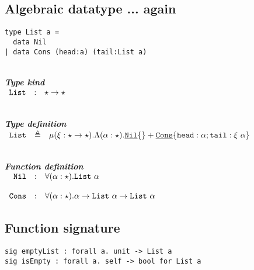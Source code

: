 \documentclass{article}[11pt]
\newcommand{\subsubsubsection}[1]
{
    ~\\
    {\bf {\em #1}} \\
}
\newcommand{\term}[1]{\verb~#1~}
\newcommand{\cons}[1]{\underline{\verb~#1~}}
\begin{document}
    \subsection{Algebraic datatype ... again}

    \begin{verbatim}
type List a =
  data Nil
| data Cons (head:a) (tail:List a)
    \end{verbatim}

    \subsubsubsection{Type kind}

    \noindent
    \begin{math}
        \begin{array}{rclp{5cm}}
            \term{List} & : & \star \rightarrow \star
        \end{array}
    \end{math}

    \subsubsubsection{Type definition}

    \noindent
    \begin{math}
        \begin{array}{rclp{5cm}}
            \term{List} & \triangleq & \mu(\xi:\star \rightarrow \star).\Lambda(\alpha:\star).\cons{Nil}\{\} + \cons{Cons}\{ \term{head} :\alpha; \term{tail} : \xi ~ \alpha \}
        \end{array}
    \end{math}

    \subsubsubsection{Function definition}

    \noindent
    \begin{math}
        \begin{array}{rclp{5cm}}
            \term{Nil}  & : & \forall(\alpha:\star).\term{List} ~ \alpha                                                   \\                                                                                    \\
            \term{Cons} & : & \forall(\alpha:\star).\alpha \rightarrow \term{List}~\alpha \rightarrow \term{List} ~ \alpha
        \end{array}
    \end{math}

    \subsection{Function signature}\label{subsec:function-signature}

    \begin{verbatim}
sig emptyList : forall a. unit -> List a
sig isEmpty : forall a. self -> bool for List a
    \end{verbatim}
\end{document}

